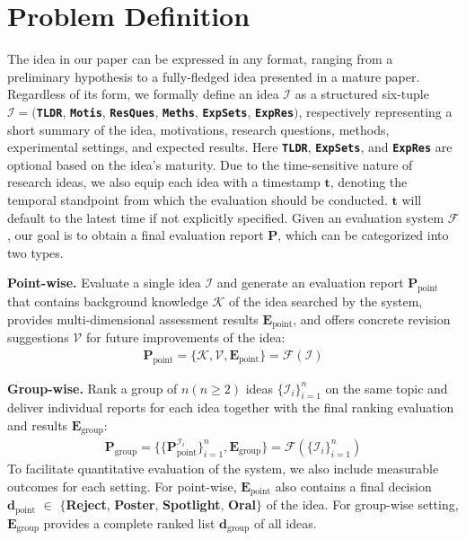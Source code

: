 \section{Problem Definition}
\label{sec:definition}
The idea in our paper can be expressed in any format, ranging from a preliminary hypothesis to a fully-fledged idea presented in a mature paper.
Regardless of its form, we formally define an idea \(\boldsymbol{\mathcal{I}}\) as a structured six-tuple $\boldsymbol{\mathcal{I}}=($\textbf{\texttt{TLDR}}, \textbf{\texttt{Motis}}, \textbf{\texttt{ResQues}}, \textbf{\texttt{Meths}}, \textbf{\texttt{ExpSets}}, \textbf{\texttt{ExpRes}}$)$, respectively representing a short summary of the idea, motivations, research questions, methods, experimental settings, and expected results.
Here \textbf{\texttt{TLDR}}, \textbf{\texttt{ExpSets}}, and \textbf{\texttt{ExpRes}} are optional based on the idea's maturity.
Due to the time-sensitive nature of research ideas, we also equip each idea with a timestamp $\boldsymbol{t}$, denoting the temporal standpoint from which the evaluation should be conducted.
$\boldsymbol{t}$ will default to the latest time if not explicitly specified.
Given an evaluation system $\boldsymbol{\mathcal{F}}$, our goal is to obtain a final evaluation report $\boldsymbol{P}$, which can be categorized into two types.

\textbf{Point-wise.} Evaluate a single idea $\boldsymbol{\mathcal{I}}$ and generate an evaluation report $\boldsymbol{P}_{\textrm{point}}$ that contains background knowledge $\boldsymbol{\mathcal{K}}$ of the idea searched by the system, provides multi-dimensional assessment results $\boldsymbol{E}_{\textrm{point}}$, and offers concrete revision suggestions $\boldsymbol{\mathcal{V}}$ for future improvements of the idea:
\begin{align}
\label{eqn:point_report}
    \boldsymbol{P}_{\textrm{point}}=\{\boldsymbol{\mathcal{K}},\boldsymbol{\mathcal{V}},\boldsymbol{E}_{\textrm{point}}\}=\boldsymbol{\mathcal{F}}(\boldsymbol{\mathcal{I}})
\end{align}

\textbf{Group-wise.} Rank a group of $n(n\ge2)$ ideas $\{\boldsymbol{\mathcal{I}}_i\}_{i=1}^n$ on the same topic and deliver individual reports for each idea together with the final ranking evaluation and results $\boldsymbol{E}_{\textrm{group}}$:
\begin{align}
\label{eqn:group_report}
    \boldsymbol{P}_{\textrm{group}}=\{\{\boldsymbol{P}^{\mathcal{I}_i}_{\textrm{point}}\}_{i=1}^n, \boldsymbol{E}_{\textrm{group}}\}=\boldsymbol{\mathcal{F}}(\{\boldsymbol{\mathcal{I}}_i\}_{i=1}^n)
\end{align}
To facilitate quantitative evaluation of the system, we also include measurable outcomes for each setting.
For point-wise, $\boldsymbol{E}_{\textrm{point}}$ also contains a final decision 
$\boldsymbol{d}_{\textrm{point}}$ $\in$ $\{$\textbf{Reject}, \textbf{Poster}, \textbf{Spotlight}, \textbf{Oral}$\}$ of the idea.
For group-wise setting, $\boldsymbol{E}_{\textrm{group}}$ provides a complete ranked list $\boldsymbol{d}_{\textrm{group}}$ of all ideas.
